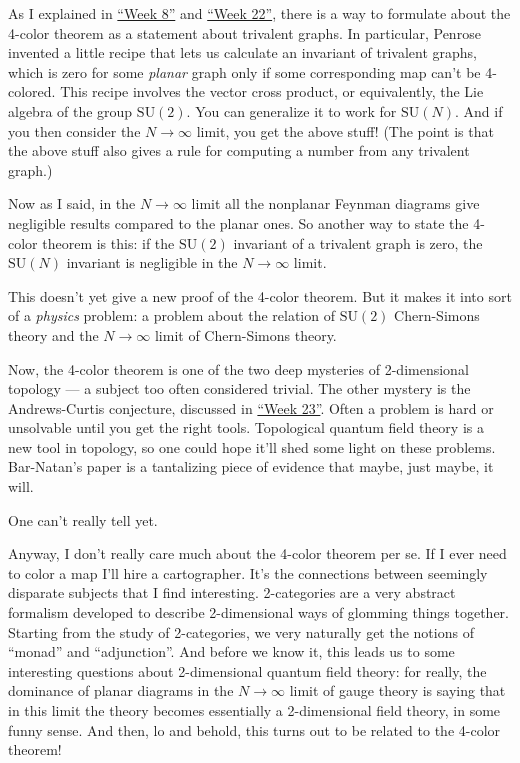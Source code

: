 \documentclass{article}
\begin{document}
As I explained in \protect\hyperlink{week8}{``Week 8''} and
\protect\hyperlink{week22}{``Week 22''}, there is a way to formulate
about the 4-color theorem as a statement about trivalent graphs. In
particular, Penrose invented a little recipe that lets us calculate an
invariant of trivalent graphs, which is zero for some \emph{planar}
graph only if some corresponding map can't be 4-colored. This recipe
involves the vector cross product, or equivalently, the Lie algebra of
the group \(\mathrm{SU}(2)\). You can generalize it to work for
\(\mathrm{SU}(N)\). And if you then consider the \(N\to\infty\) limit,
you get the above stuff! (The point is that the above stuff also gives a
rule for computing a number from any trivalent graph.)

Now as I said, in the \(N\to\infty\) limit all the nonplanar Feynman
diagrams give negligible results compared to the planar ones. So another
way to state the 4-color theorem is this: if the \(\mathrm{SU}(2)\)
invariant of a trivalent graph is zero, the \(\mathrm{SU}(N)\) invariant
is negligible in the \(N\to\infty\) limit.

This doesn't yet give a new proof of the 4-color theorem. But it makes
it into sort of a \emph{physics} problem: a problem about the relation
of \(\mathrm{SU}(2)\) Chern-Simons theory and the \(N\to\infty\) limit
of Chern-Simons theory.

Now, the 4-color theorem is one of the two deep mysteries of
2-dimensional topology --- a subject too often considered trivial. The
other mystery is the Andrews-Curtis conjecture, discussed in
\protect\hyperlink{week23}{``Week 23''}. Often a problem is hard or
unsolvable until you get the right tools. Topological quantum field
theory is a new tool in topology, so one could hope it'll shed some
light on these problems. Bar-Natan's paper is a tantalizing piece of
evidence that maybe, just maybe, it will.

One can't really tell yet.

Anyway, I don't really care much about the 4-color theorem per se. If I
ever need to color a map I'll hire a cartographer. It's the connections
between seemingly disparate subjects that I find interesting.
2-categories are a very abstract formalism developed to describe
2-dimensional ways of glomming things together. Starting from the study
of 2-categories, we very naturally get the notions of ``monad'' and
``adjunction''. And before we know it, this leads us to some interesting
questions about 2-dimensional quantum field theory: for really, the
dominance of planar diagrams in the \(N\to\infty\) limit of gauge theory
is saying that in this limit the theory becomes essentially a
2-dimensional field theory, in some funny sense. And then, lo and
behold, this turns out to be related to the 4-color theorem!
\end{document}
